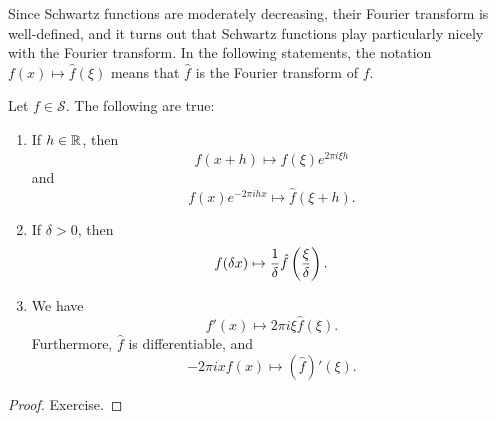 \documentclass[11pt, letterpaper]{aq-notes}
\newcommand{\schwartz}{\mathcal{S}}
\begin{document}
Since Schwartz functions are moderately decreasing, their Fourier transform is well-defined, and it turns out that Schwartz functions play particularly nicely with the Fourier transform. In the following statements, the notation $f(x) \mapsto \hat{f}(\xi)$ means that $\hat{f}$ is the Fourier transform of $f$.

\begin{proposition}\label{prop:fourier-prop}
	Let $f \in \schwartz$. The following are true:
	\begin{enumerate}[label=(\roman*)]
		\item If $h \in \mathbb{R}$, then
		\[
			f(x + h) \mapsto \hat{f}(\xi)e^{2\pi i\xi h}
		\]
		and
		\[
			f(x)e^{-2\pi i hx} \mapsto \hat{f}(\xi + h).
		\]
		\item If $\delta > 0$, then
		\[
			f(\delta x) \mapsto \frac{1}{\delta}\hat{f}\left(\frac{\xi}{\delta}\right).
		\]
		\item We have
		\[
			f'(x) \mapsto 2\pi i \xi\hat{f}(\xi).
		\]
		Furthermore, $\hat{f}$ is differentiable, and
		\[
			-2\pi i xf(x) \mapsto (\hat{f})'(\xi).
		\]
	\end{enumerate}
\end{proposition}

\begin{proof}
	Exercise.
\end{proof}
\end{document}
